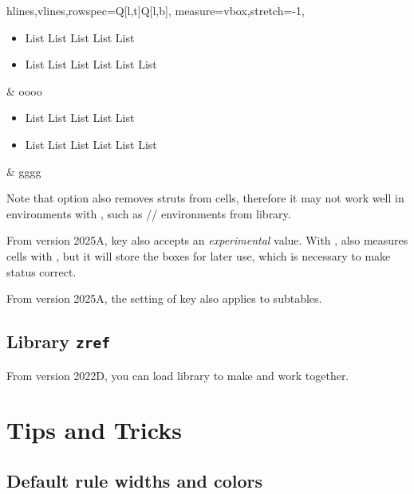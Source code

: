 \documentclass[oneside]{book}
\renewcommand\emph[1]{\textit{\color{red3}#1}}
\begin{document}
\begin{codehigh}
\begin{tblr}{
  hlines,vlines,rowspec={Q[l,t]Q[l,b]},
  measure=vbox,stretch=-1,
}
  \begin{itemize}[nosep]
    \item List List List List List
    \item List List List List List List
  \end{itemize} & oooo \\
  \begin{itemize}[nosep]
    \item List List List List List
    \item List List List List List List
  \end{itemize} & gggg \\
\end{tblr}
\end{codehigh}

Note that option  also removes struts from cells, therefore it may not work well
in  environments with , such as
// environments from  library.

From version 2025A,  key also accepts an \emph{experimental}  value.
With ,  also measures cells with \CC{\vbox},
but it will store the boxes for later use,
which is necessary to make \CC{\lTblrMeasuringBool} status correct.

From version 2025A, the setting of  key also applies to subtables.

\section{Library \texttt{zref}}

From version 2022D, you can load  library
to make \CC{\zref} and  work together.

\chapter{Tips and Tricks}

\section{Default rule widths and colors}
\end{document}
